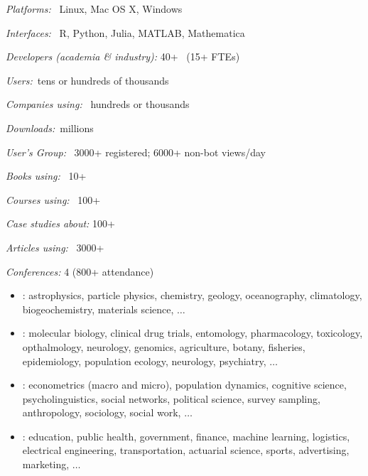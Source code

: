\documentclass[10pt]{report}
\begin{document}
\begin{subitemize}
\item \textit{Platforms:} \ Linux, Mac OS X, Windows
\vspace*{-4pt}
\item \textit{Interfaces:} \ R, Python, Julia, MATLAB, Mathematica
\vspace*{-4pt}
\item \textit{Developers (academia \& industry):} 40+ \ {\small (15+ FTEs)}
\vspace*{-4pt}
\item \textit{Users:}\ tens or hundreds of thousands
\vspace*{-4pt}
\item \textit{Companies using:} \ hundreds or thousands
\vspace*{-4pt}
\item \textit{Downloads:}\ millions
\vspace*{-4pt}
\item \textit{User's Group:} \ 3000+ registered; 6000+ non-bot views/day
\vspace*{-4pt}
\item \textit{Books using:} \ 10+
\vspace*{-4pt}
\item \textit{Courses using:} \ 100+
\vspace*{-4pt}
\item \textit{Case studies about:} 100+
\vspace*{-4pt}
\item \textit{Articles using:} \ 3000+
\vspace*{-4pt}
\item \textit{Conferences:} 4 (800+ attendance)
\end{subitemize}

%
\begin{itemize}
\item {}: {\footnotesize
astrophysics, particle physics, chemistry, geology, oceanography,
climatology, biogeochemistry, materials science, $\ldots$
}
\item {}: {\footnotesize
molecular biology, clinical drug trials, entomology, pharmacology,
toxicology, opthalmology, neurology, genomics, agriculture, botany, fisheries,
epidemiology, population ecology, neurology, psychiatry, $\ldots$
}
\vspace*{-3pt}
\item {}: {\footnotesize
 econometrics (macro and micro), population dynamics, cognitive
 science, psycholinguistics, social networks, political science,
 survey sampling, anthropology, sociology, social work, $\ldots$
}
\vspace*{-3pt}
\item {}: {\footnotesize education, public health,
government, finance, machine learning, logistics, electrical engineering,  transportation, actuarial science, sports, advertising, marketing, $\ldots$}
\end{itemize}
\end{document}
